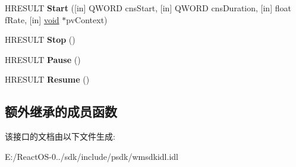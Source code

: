 \begin{DoxyCompactItemize}
\item 
\mbox{\label{interface_i_w_m_reader_aacd1559becedbacdf30eb803d84c8361}} 
H\+R\+E\+S\+U\+LT {\bfseries Start} (\mbox{[}in\mbox{]} Q\+W\+O\+RD cns\+Start, \mbox{[}in\mbox{]} Q\+W\+O\+RD cns\+Duration, \mbox{[}in\mbox{]} float f\+Rate, \mbox{[}in\mbox{]} \hyperlink{interfacevoid}{void} $\ast$pv\+Context)
\item 
\mbox{\label{interface_i_w_m_reader_a2e845b3d0ec2cbed82d59790273d6302}} 
H\+R\+E\+S\+U\+LT {\bfseries Stop} ()
\item 
\mbox{\label{interface_i_w_m_reader_a8ec21f87a81c173bc740d240e5783325}} 
H\+R\+E\+S\+U\+LT {\bfseries Pause} ()
\item 
\mbox{\label{interface_i_w_m_reader_aa317feb4aa45bf8955080b68fedc7f24}} 
H\+R\+E\+S\+U\+LT {\bfseries Resume} ()
\end{DoxyCompactItemize}
\subsection*{额外继承的成员函数}


该接口的文档由以下文件生成\+:\begin{DoxyCompactItemize}
\item 
E\+:/\+React\+O\+S-\/0../sdk/include/psdk/wmsdkidl.\+idl\end{DoxyCompactItemize}
